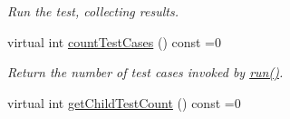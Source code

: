\begin{DoxyCompactItemize}
\begin{DoxyCompactList}\small\item\em Run the test, collecting results. \end{DoxyCompactList}\item 
virtual int \hyperlink{class_test_aad2b7244c7cec3f3aa9f81d12b15c8cf}{count\+Test\+Cases} () const =0
\begin{DoxyCompactList}\small\item\em Return the number of test cases invoked by \hyperlink{class_test_a7beeb95dc0d058bd3bfea1a75463cb03}{run()}. \end{DoxyCompactList}\item 
\hypertarget{class_test_a7aaab95037b7222573471074c56df85b}{virtual int \hyperlink{class_test_a7aaab95037b7222573471074c56df85b}{get\+Child\+Test\+Count} () const =0}\label{class_test_a7aaab95037b7222573471074c56df85b}


\end{DoxyCompactItemize}
